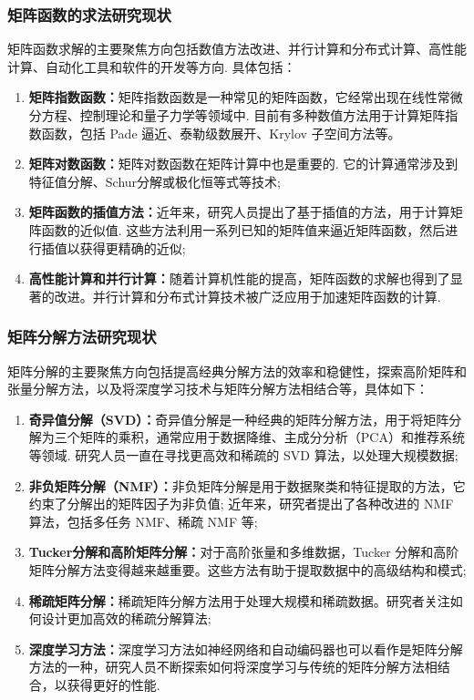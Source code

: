         \subsubsection{矩阵函数的求法研究现状}
            \par 矩阵函数求解的主要聚焦方向包括数值方法改进、并行计算和分布式计算、高性能计算、自动化工具和软件的开发等方向. 具体包括：
            \begin{enumerate}
                \item \textbf{矩阵指数函数：}矩阵指数函数是一种常见的矩阵函数，它经常出现在线性常微分方程、控制理论和量子力学等领域中. 目前有多种数值方法用于计算矩阵指数函数，包括 Pade 逼近、泰勒级数展开、Krylov 子空间方法等。
                \item \textbf{矩阵对数函数：}矩阵对数函数在矩阵计算中也是重要的. 它的计算通常涉及到特征值分解、Schur分解或极化恒等式等技术;
                \item \textbf{矩阵函数的插值方法：}近年来，研究人员提出了基于插值的方法，用于计算矩阵函数的近似值. 这些方法利用一系列已知的矩阵值来逼近矩阵函数，然后进行插值以获得更精确的近似;
                \item \textbf{高性能计算和并行计算：}随着计算机性能的提高，矩阵函数的求解也得到了显著的改进。并行计算和分布式计算技术被广泛应用于加速矩阵函数的计算.
            \end{enumerate}

        \subsubsection{矩阵分解方法研究现状}
            \par 矩阵分解的主要聚焦方向包括提高经典分解方法的效率和稳健性，探索高阶矩阵和张量分解方法，以及将深度学习技术与矩阵分解方法相结合等，具体如下：
            \begin{enumerate}
                \item \textbf{奇异值分解（SVD）：}奇异值分解是一种经典的矩阵分解方法，用于将矩阵分解为三个矩阵的乘积，通常应用于数据降维、主成分分析（PCA）和推荐系统等领域. 研究人员一直在寻找更高效和稀疏的 SVD 算法，以处理大规模数据;
                \item \textbf{非负矩阵分解（NMF）：}非负矩阵分解是用于数据聚类和特征提取的方法，它约束了分解出的矩阵因子为非负值; 近年来，研究者提出了各种改进的 NMF 算法，包括多任务 NMF、稀疏 NMF 等;
                \item \textbf{Tucker分解和高阶矩阵分解：}对于高阶张量和多维数据，Tucker 分解和高阶矩阵分解方法变得越来越重要。这些方法有助于提取数据中的高级结构和模式;
                \item \textbf{稀疏矩阵分解：}稀疏矩阵分解方法用于处理大规模和稀疏数据。研究者关注如何设计更加高效的稀疏分解算法;
                \item \textbf{深度学习方法：}深度学习方法如神经网络和自动编码器也可以看作是矩阵分解方法的一种，研究人员不断探索如何将深度学习与传统的矩阵分解方法相结合，以获得更好的性能.
            \end{enumerate}

